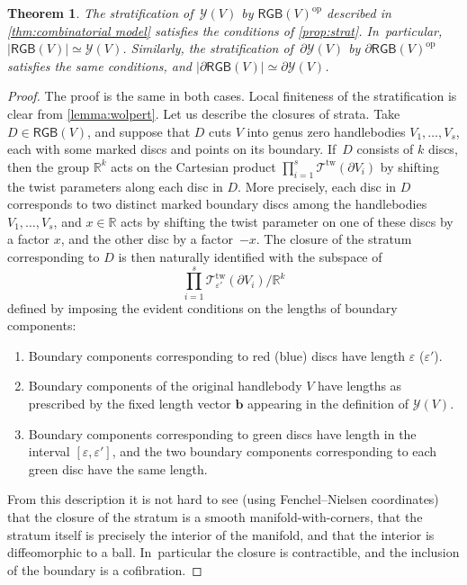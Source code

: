 \documentclass[JEP,XML,SOM,Unicode,NoFloatCountersInSection,published]{cedram}
\newcommand{\bb}{\boldsymbol{b}}
\theoremstyle{plain}
\newtheorem{thm}{Theorem}[section]
\theoremstyle{definition}
\let\eps\varepsilon
\newcommand{\R}{\mathbb R}
\newcommand{\TT}{\mathcal T^{\mathrm{tw}}}
\newcommand{\Y}{\mathcal Y}
\newcommand{\RGB}{{\mathsf{RGB}}}
\newcommand{\op}{{\mathrm{op}}}
\begin{document}
\begin{thm}\label{thm:combinatorial model 2} The stratification of $\,\Y(V)$ by $\RGB(V)^\op$ described in \cref{thm:combinatorial model} satisfies the conditions of \cref{prop:strat}. In~particular, $|\RGB(V)| \simeq \Y(V)$. Similarly, the stratification of $\,\partial \Y(V)$ by $\partial\RGB(V)^\op$ satisfies the same conditions, and $|\partial \RGB(V)| \simeq \partial\Y(V)$.
\end{thm}

\begin{proof}The proof is the same in both cases.
Local finiteness of the stratification is clear from \cref{lemma:wolpert}. Let us describe the closures of strata. Take $D \in \RGB(V)$, and suppose that $D$ cuts $V$ into genus zero handlebodies $V_1,\dots,V_s$, each with some marked discs and points on its boundary. If~$D$ consists of $k$ discs, then the group $\R^k$ acts on the Cartesian product
$\prod_{i=1}^s \TT(\partial V_i)$ by shifting the twist parameters along each disc in $D$. More precisely, each disc in $D$ corresponds to two distinct marked boundary discs among the handlebodies $V_1,\dots,V_s$, and $x \in \R$ acts by shifting the twist parameter on one of these discs by a factor $x$, and the other disc by a factor~$-x$. The closure of the stratum corresponding to $D$ is then naturally identified with the subspace of\vspace*{-3pt}\enlargethispage{.5\baselineskip}
\[
\prod_{i=1}^s \TT_{\eps'}(\partial V_i)/\R^k
\]
defined by imposing the evident conditions on the lengths of boundary components:
\begin{enumerate}
\item Boundary components corresponding to red (\resp blue) discs have length $\eps$ (\resp $\eps'$).
\item Boundary components of the original handlebody $V$ have lengths as prescribed by the fixed length vector $\bb$ appearing in the definition of $\Y(V)$.
\item Boundary components corresponding to green discs have length in the interval $[\eps,\eps']$, and the two boundary components corresponding to each green disc have the same length.
\end{enumerate}
From this description it is not hard to see (using Fenchel--Nielsen coordinates) that the closure of the stratum is a smooth manifold-with-corners, that the stratum itself is precisely the interior of the manifold, and that the interior is diffeomorphic to a ball. In~particular the closure is contractible, and the inclusion of the boundary is a cofibration.
\end{proof}
\end{document}
